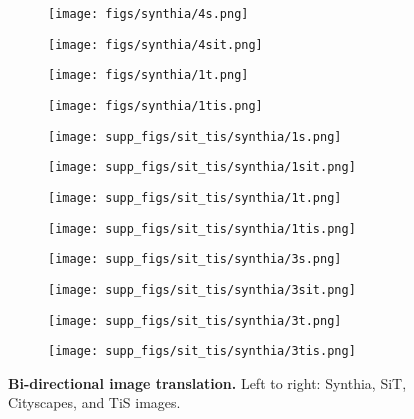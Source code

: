 \documentclass[letterpaper]{article} \usepackage[]{aaai23}  \usepackage{times}  \usepackage{helvet}  \usepackage{courier}  \usepackage[hyphens]{url}  \usepackage{graphicx} \urlstyle{rm} \def\UrlFont{\rm}  \usepackage{natbib}  \usepackage{caption} \frenchspacing  \setlength{\pdfpagewidth}{8.5in} \setlength{\pdfpageheight}{11in} \usepackage{algorithm}
\begin{document}
\begin{figure*}
    \centering
    \begin{subfigure}{0.24\linewidth}
        \centering
        \texttt{[image: figs/synthia/4s.png]}
    \end{subfigure}
    \begin{subfigure}{0.24\linewidth}
        \centering
        \texttt{[image: figs/synthia/4sit.png]}
    \end{subfigure}
    \begin{subfigure}{0.24\linewidth}
        \centering
        \texttt{[image: figs/synthia/1t.png]}
    \end{subfigure}
    \begin{subfigure}{0.24\linewidth}
        \centering
        \texttt{[image: figs/synthia/1tis.png]}
    \end{subfigure}
    \begin{subfigure}{0.24\linewidth}
        \centering
        \texttt{[image: supp\_figs/sit\_tis/synthia/1s.png]}
    \end{subfigure}
    \begin{subfigure}{0.24\linewidth}
        \centering
        \texttt{[image: supp\_figs/sit\_tis/synthia/1sit.png]}
    \end{subfigure}
    \begin{subfigure}{0.24\linewidth}
        \centering
        \texttt{[image: supp\_figs/sit\_tis/synthia/1t.png]}
    \end{subfigure}
    \begin{subfigure}{0.24\linewidth}
        \centering
        \texttt{[image: supp\_figs/sit\_tis/synthia/1tis.png]}
    \end{subfigure}
    \begin{subfigure}{0.24\linewidth}
        \centering
        \texttt{[image: supp\_figs/sit\_tis/synthia/3s.png]}
    \end{subfigure}
    \begin{subfigure}{0.24\linewidth}
        \centering
        \texttt{[image: supp\_figs/sit\_tis/synthia/3sit.png]}
    \end{subfigure}
    \begin{subfigure}{0.24\linewidth}
        \centering
        \texttt{[image: supp\_figs/sit\_tis/synthia/3t.png]}
    \end{subfigure}
    \begin{subfigure}{0.24\linewidth}
        \centering
        \texttt{[image: supp\_figs/sit\_tis/synthia/3tis.png]}
    \end{subfigure}
    \caption{\textbf{Bi-directional  image translation.} Left to right: Synthia, SiT, Cityscapes, and TiS images.}
    \label{fig:sit_tis_synthia_translations}
\end{figure*}

\clearpage

\end{document}
